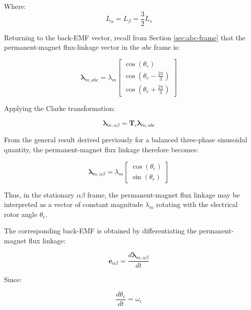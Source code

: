 \documentclass{article}
\begin{document}
Where: 
\begin{equation}
    L_{\alpha} = L_{\beta} = \frac{3}{2}L_s
\end{equation}

Returning to the back-EMF vector, recall from Section \ref{sec:abc-frame} that the permanent-magnet flux-linkage vector in the $abc$ frame is:

\begin{equation}
    \boldsymbol{\lambda}_{m,abc}
    =
    \lambda_m
    \begin{bmatrix}
        \cos(\theta_e) \\
        \cos\left(\theta_e-\frac{2\pi}{3}\right) \\
        \cos\left(\theta_e+\frac{2\pi}{3}\right)
    \end{bmatrix}
\end{equation}

Applying the Clarke transformation:

\begin{equation}
    \boldsymbol{\lambda}_{m,\alpha\beta}
    =
    \mathbf{T}_c\boldsymbol{\lambda}_{m,abc}
\end{equation}

From the general result derived previously for a balanced three-phase sinusoidal quantity, the permanent-magnet flux linkage therefore becomes:

\begin{equation}
    \boldsymbol{\lambda}_{m,\alpha\beta}
    =
    \lambda_m
    \begin{bmatrix}
        \cos(\theta_e) \\
        \sin(\theta_e)
    \end{bmatrix}
\end{equation}

Thus, in the stationary $\alpha\beta$ frame, the permanent-magnet flux linkage may be interpreted as a vector of constant magnitude $\lambda_m$ rotating with the electrical rotor angle $\theta_e$.

The corresponding back-EMF is obtained by differentiating the permanent-magnet flux linkage:

\begin{equation}
    \mathbf{e}_{\alpha\beta}
    =
    \frac{d\boldsymbol{\lambda}_{m,\alpha\beta}}{dt}
\end{equation}

Since:

\begin{equation}
    \frac{d\theta_e}{dt} = \omega_e
\end{equation}
\end{document}
